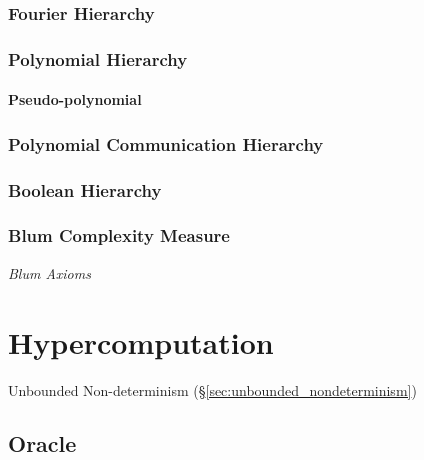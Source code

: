 \subsubsection{Fourier Hierarchy}

\subsubsection{Polynomial Hierarchy}

\paragraph{Pseudo-polynomial}\label{sec:pseudo_polynomial}\hfill

\subsubsection{Polynomial Communication Hierarchy}

\subsubsection{Boolean Hierarchy}




\subsubsection{Blum Complexity Measure}

\emph{Blum Axioms}



\section{Hypercomputation}\label{sec:hypercomputation}

Unbounded Non-determinism (\S\ref{sec:unbounded_nondeterminism})



\subsection{Oracle}\label{sec:oracle}

